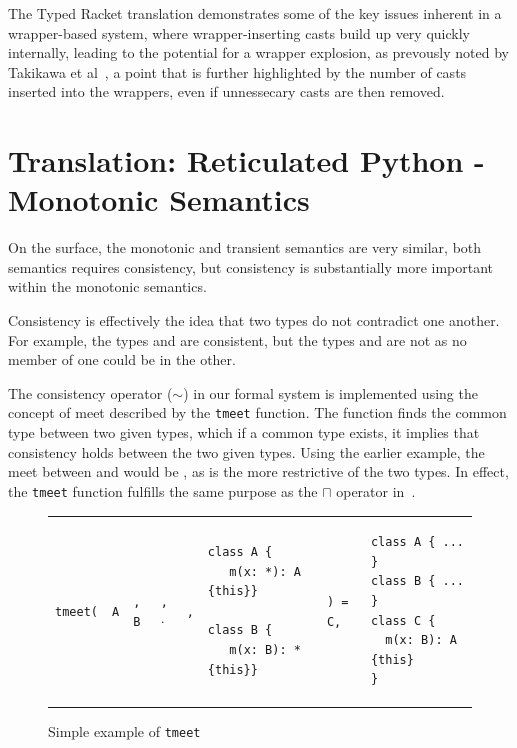 \documentclass[a4paper,USenglish]{tex/lipics-v2016}
\begin{document}
The Typed Racket translation demonstrates some of the key issues inherent in a
wrapper-based system, where wrapper-inserting casts build up very quickly
internally, leading to the potential for a wrapper explosion, as prevously noted
by Takikawa et al~\cite{practical-gt}, a point that is further highlighted by
the number of casts inserted into the wrappers, even if unnessecary casts are
then removed.




\section{Translation: Reticulated Python - Monotonic Semantics}

On the surface, the monotonic and transient 
semantics are very similar, both semantics requires consistency, 
but consistency is substantially more important within the monotonic semantics. 

\begin{mathpar}
\end{mathpar}

Consistency is effectively the idea that two types do not
contradict one another. For example, the types  and \any are
consistent, but the types  and  are not as no member of
one could be in the other.

The consistency operator ($\sim$) in our formal system is implemented using the concept of meet described
by the \texttt{tmeet} function. The  function finds the common type 
between two given types, which if a common type exists, it implies that consistency holds between 
the two given types. Using the earlier example, the meet between  and \any would be , 
as  is the more restrictive of the two types. In effect, the \texttt{tmeet} function fulfills the 
same purpose as the $\sqcap$ operator in~\cite{Siek2015}. 

\begin{figure}[!ht]
\begin{tabular}{EEEEEVEV}
\texttt{tmeet(}
& \texttt{A}
  & \texttt{,}
  \texttt{B}
  & \texttt{,}
  $\cdot$
  & \texttt{,}
  &
\begin{lstlisting}
class A {
   m(x: *): A {this}}

class B {
   m(x: B): * {this}}
\end{lstlisting}    
& 
\texttt{) = C,}
  &
\begin{lstlisting}
class A { ... }
class B { ... }
class C {
  m(x: B): A {this}
}
\end{lstlisting}    
\end{tabular}
\caption{Simple example of \texttt{tmeet}}
\label{fig:tmeet_ex}
\end{figure}
\end{document}
